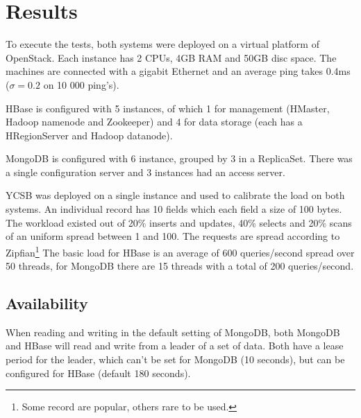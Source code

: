 \documentclass[10pt,conference,letterpaper]{IEEEtran}
\begin{document}
\section{Results}\label{sec:result}
To execute the tests, both systems were deployed on a virtual platform of OpenStack. Each instance has 2 CPUs, 4GB RAM and 50GB disc space. The machines are connected with a gigabit Ethernet and an average ping takes 0.4ms ($\sigma = 0.2$ on 10 000 ping's).

HBase is configured with 5 instances, of which 1 for management (HMaster, Hadoop namenode and Zookeeper) and 4 for data storage (each has a HRegionServer and Hadoop datanode). 

MongoDB is configured with 6 instance, grouped by 3 in a ReplicaSet. There was a single configuration server and 3 instances had an access server. 

YCSB was deployed on a single instance and used to calibrate the load on both systems. An individual record has 10 fields which each field a size of 100 bytes. The workload existed out of 20\% inserts and updates, 40\% selects and 20\% scans of an uniform spread between 1 and 100. The requests are spread according to Zipfian\footnote{Some record are popular, others rare to be used.}  The basic load for HBase is an average of 600 queries/second spread over 50 threads, for MongoDB there are 15 threads with a total of 200 queries/second. 

\subsection{Availability}
When reading and writing in the default setting of MongoDB, both MongoDB and HBase will read and write from a leader of a set of data. Both have a lease period for the leader, which can't be set for MongoDB (10 seconds), but can be configured for HBase (default 180 seconds). 
\end{document}
